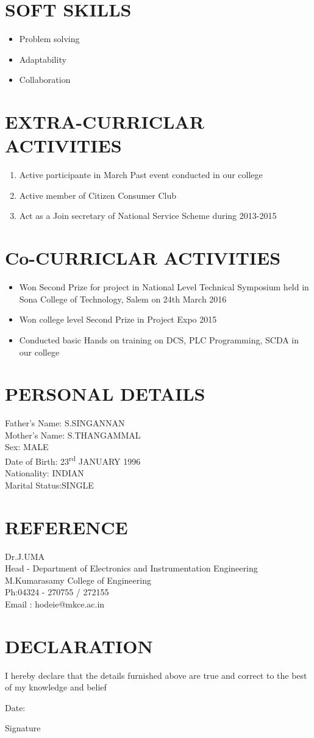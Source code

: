 \documentclass{My_CV_Class}
\begin{document}
\section{\textcolor{mycolor}{SOFT SKILLS}}
\begin{itemize}
	\item Problem solving
	\item Adaptability
	\item Collaboration
\end{itemize}
\section{\textcolor{mycolor}{EXTRA-CURRICLAR ACTIVITIES}}
\begin{enumerate}
	\item Active participante in March Past event conducted in our college
	\item Active member of Citizen Consumer Club
	\item Act as a Join secretary of National Service Scheme during 2013-2015
\end{enumerate}
\section{\textcolor{mycolor}{Co-CURRICLAR ACTIVITIES}}
\begin{itemize}
	\item Won Second Prize for project in National Level Technical Symposium held in Sona College of Technology, Salem on 24th March 2016
	\item Won college level Second Prize in Project Expo 2015
	\item Conducted basic Hands on training on DCS, PLC Programming, SCDA in our college
\end{itemize}
\section{\textcolor{mycolor}{PERSONAL DETAILS}}
Father's Name: S.SINGANNAN \\
Mother's Name: S.THANGAMMAL\\
Sex:		   MALE\\
Date of Birth: 23\textsuperscript{rd} JANUARY 1996\\
Nationality:   INDIAN\\
Marital Status:SINGLE
\section{\textcolor{mycolor}{REFERENCE}}
Dr.J.UMA\\
Head - Department of Electronics and Instrumentation Engineering\\
M.Kumarasamy College of Engineering\\
Ph:04324 - 270755 / 272155\\
Email : hodeie@mkce.ac.in
\section{\textcolor{mycolor}{DECLARATION}}
\hspace{6mm}  I hereby declare that the details furnished above are true and correct to the best of my knowledge and belief
\vspace{1.5cm}
\begin{flushleft}
	Date: \begin{flushright}
		Signature
	\end{flushright}
\end{flushleft}
\end{document}
